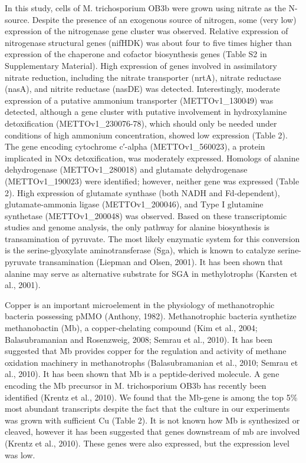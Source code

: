 In this study, cells of M. trichosporium OB3b were grown using nitrate as the N-source.
Despite the presence of an exogenous source of nitrogen, some (very low) expression of the nitrogenase gene cluster was observed.
Relative expression of nitrogenase structural genes (nifHDK) was about four to five times higher than expression of the chaperone and cofactor biosynthesis genes (Table S2 in Supplementary Material).
High expression of genes involved in assimilatory nitrate reduction, including the nitrate transporter (nrtA), nitrate reductase (nasA), and nitrite reductase (nasDE) was detected.
Interestingly, moderate expression of a putative ammonium transporter (METTOv1\_130049) was detected, although a gene cluster with putative involvement in hydroxylamine detoxification (METTOv1\_230076-78), which should only be needed under conditions of high ammonium concentration, showed low expression (Table 2).
The gene encoding cytochrome c′-alpha (METTOv1\_560023), a protein implicated in NOx detoxification, was moderately expressed.
Homologs of alanine dehydrogenase (METTOv1\_280018) and glutamate dehydrogenase (METTOv1\_190023) were identified; however, neither gene was expressed (Table 2).
High expression of glutamate synthase (both NADH and Fd-dependent), glutamate-ammonia ligase (METTOv1\_200046), and Type I glutamine synthetase (METTOv1\_200048) was observed.
Based on these transcriptomic studies and genome analysis, the only pathway for alanine biosynthesis is transamination of pyruvate.
The most likely enzymatic system for this conversion is the serine-glyoxylate aminotransferase (Sga), which is known to catalyze serine-pyruvate transamination (Liepman and Olsen, 2001).
It has been shown that alanine may serve as alternative substrate for SGA in methylotrophs (Karsten et al., 2001).

Copper is an important microelement in the physiology of methanotrophic bacteria possessing pMMO (Anthony, 1982).
Methanotrophic bacteria synthetize methanobactin (Mb), a copper-chelating compound (Kim et al., 2004; Balasubramanian and Rosenzweig, 2008; Semrau et al., 2010).
It has been suggested that Mb provides copper for the regulation and activity of methane oxidation machinery in methanotrophs (Balasubramanian et al., 2010; Semrau et al., 2010).
It has been shown that Mb is a peptide-derived molecule.
A gene encoding the Mb precursor in M. trichosporium OB3b has recently been identified (Krentz et al., 2010).
We found that the Mb-gene is among the top 5\% most abundant transcripts despite the fact that the culture in our experiments was grown with sufficient Cu (Table 2).
It is not known how Mb is synthesized or cleaved, however it has been suggested that genes downstream of mb are involved (Krentz et al., 2010).
These genes were also expressed, but the expression level was low.

